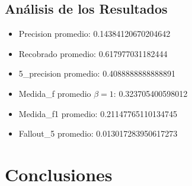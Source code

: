 \documentclass[runningheads]{llncs}
\begin{document}
\subsection{An\'alisis de los Resultados}
\begin{itemize}
\item Precision promedio:  0.14384120670204642
\item Recobrado promedio:  0.617977031182444
\item 5\_precision promedio:  0.4088888888888891
\item Medida\_f promedio  $ \beta=1 $:  0.323705400598012
\item Medida\_f1 promedio:  0.21147765110134745
\item Fallout\_5 promedio:  0.013017283950617273
\end{itemize}
	\section{Conclusiones}
	
	
	
	\begin{thebibliography}{1}
		
	\end{thebibliography}
\end{document}
